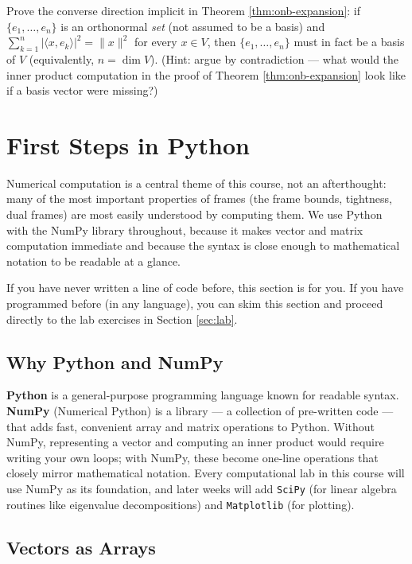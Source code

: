 \begin{exercisebox}[title={Exercise 1.2}]
Prove the converse direction implicit in Theorem \ref{thm:onb-expansion}: if $\{e_1, \ldots, e_n\}$ is an orthonormal \emph{set} (not assumed to be a basis) and $\sum_{k=1}^n |\langle x, e_k\rangle|^2 = \|x\|^2$ for every $x \in V$, then $\{e_1, \ldots, e_n\}$ must in fact be a basis of $V$ (equivalently, $n = \dim V$). (Hint: argue by contradiction --- what would the inner product computation in the proof of Theorem \ref{thm:onb-expansion} look like if a basis vector were missing?)
\end{exercisebox}

\section{First Steps in Python}
\label{sec:python-onramp}

Numerical computation is a central theme of this course, not an afterthought: many of the most important properties of frames (the frame bounds, tightness, dual frames) are most easily understood by computing them. We use Python with the NumPy library throughout, because it makes vector and matrix computation immediate and because the syntax is close enough to mathematical notation to be readable at a glance.

If you have never written a line of code before, this section is for you. If you have programmed before (in any language), you can skim this section and proceed directly to the lab exercises in Section \ref{sec:lab}.

\subsection{Why Python and NumPy}
\label{subsec:why-python}

\textbf{Python} is a general-purpose programming language known for readable syntax. \textbf{NumPy} (Numerical Python) is a library --- a collection of pre-written code --- that adds fast, convenient array and matrix operations to Python. Without NumPy, representing a vector and computing an inner product would require writing your own loops; with NumPy, these become one-line operations that closely mirror mathematical notation. Every computational lab in this course will use NumPy as its foundation, and later weeks will add \texttt{SciPy} (for linear algebra routines like eigenvalue decompositions) and \texttt{Matplotlib} (for plotting).

\subsection{Vectors as Arrays}
\label{subsec:vectors-as-arrays}

